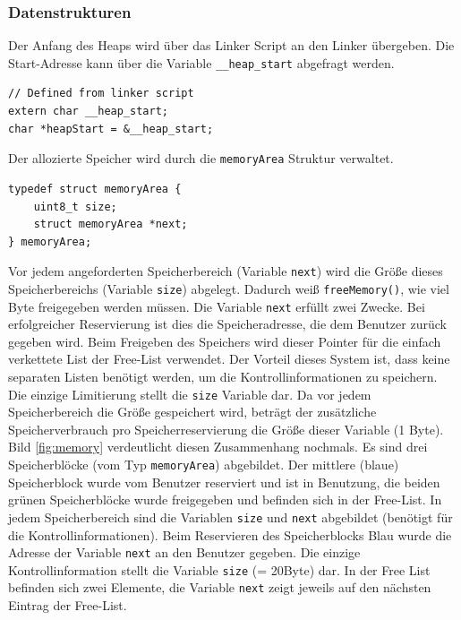 \documentclass[fontsize=12pt, toc=bibliography, notitlepage]{scrreprt}
\begin{document}
\subsubsection{Datenstrukturen}
Der Anfang des Heaps wird über das Linker Script an den Linker übergeben. Die Start-Adresse kann über die Variable \lstinline$__heap_start$ abgefragt werden.

\begin{lstlisting}[title=memory.c]
// Defined from linker script
extern char __heap_start;
char *heapStart = &__heap_start;
\end{lstlisting}

Der allozierte Speicher wird durch die \lstinline$memoryArea$ Struktur verwaltet. 

\begin{lstlisting}[title=memory.c]
typedef struct memoryArea {
    uint8_t size;
    struct memoryArea *next;
} memoryArea;
\end{lstlisting}

Vor jedem angeforderten Speicherbereich (Variable \lstinline$next$) wird die Größe dieses Speicherbereichs (Variable \lstinline$size$) abgelegt. Dadurch weiß \lstinline$freeMemory()$, wie viel Byte freigegeben werden müssen. Die Variable \lstinline$next$ erfüllt zwei Zwecke. Bei erfolgreicher Reservierung ist dies die Speicheradresse, die dem Benutzer zurück gegeben wird. Beim Freigeben des Speichers wird dieser Pointer für die einfach verkettete List der Free-List verwendet. Der Vorteil dieses System ist, dass keine separaten Listen benötigt werden, um die Kontrollinformationen zu speichern. Die einzige Limitierung stellt die \lstinline$size$ Variable dar. Da vor jedem Speicherbereich die Größe gespeichert wird, beträgt der zusätzliche Speicherverbrauch pro Speicherreservierung die Größe dieser Variable (1 Byte).\\

Bild \ref{fig:memory} verdeutlicht diesen Zusammenhang nochmals. Es sind drei Speicherblöcke (vom Typ \lstinline$memoryArea$) abgebildet. Der mittlere (blaue) Speicherblock wurde vom Benutzer reserviert und ist in Benutzung, die beiden grünen Speicherblöcke wurde freigegeben und befinden sich in der Free-List. In jedem Speicherbereich sind die Variablen \lstinline$size$ und \lstinline$next$ abgebildet (benötigt für die Kontrollinformationen). Beim Reservieren des Speicherblocks Blau wurde die Adresse der Variable \lstinline$next$ an den Benutzer gegeben. Die einzige Kontrollinformation stellt die Variable \lstinline$size$ (= 20Byte) dar. In der Free List befinden sich zwei Elemente, die Variable \lstinline$next$ zeigt jeweils auf den nächsten Eintrag der Free-List.
\end{document}
